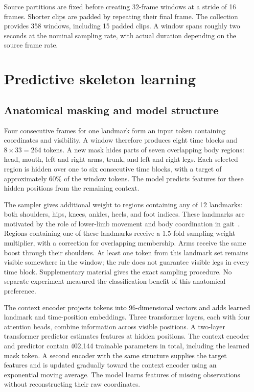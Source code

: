 \documentclass[10pt,twocolumn,letterpaper]{article}
\begin{document}
Source partitions are fixed before creating 32-frame windows at a stride of 16 frames. Shorter clips are padded by repeating their final frame. The collection provides 358 windows, including 15 padded clips. A window spans roughly two seconds at the nominal sampling rate, with actual duration depending on the source frame rate.

\section{Predictive skeleton learning}
\subsection{Anatomical masking and model structure}
Four consecutive frames for one landmark form an input token containing coordinates and visibility. A window therefore produces eight time blocks and $8\times33=264$ tokens. A new mask hides parts of seven overlapping body regions: head, mouth, left and right arms, trunk, and left and right legs. Each selected region is hidden over one to six consecutive time blocks, with a target of approximately 60\% of the window tokens. The model predicts features for these hidden positions from the remaining context.

The sampler gives additional weight to regions containing any of 12 landmarks: both shoulders, hips, knees, ankles, heels, and foot indices. These landmarks are motivated by the role of lower-limb movement and body coordination in gait~\cite{filli2018,plotnik2020}. Regions containing one of these landmarks receive a 1.5-fold sampling-weight multiplier, with a correction for overlapping membership. Arms receive the same boost through their shoulders. At least one token from this landmark set remains visible somewhere in the window; the rule does not guarantee visible legs in every time block. Supplementary material gives the exact sampling procedure. No separate experiment measured the classification benefit of this anatomical preference.

The context encoder projects tokens into 96-dimensional vectors and adds learned landmark and time-position embeddings. Three transformer layers, each with four attention heads, combine information across visible positions. A two-layer transformer predictor estimates features at hidden positions. The context encoder and predictor contain 402,144 trainable parameters in total, including the learned mask token. A second encoder with the same structure supplies the target features and is updated gradually toward the context encoder using an exponential moving average. The model learns features of missing observations without reconstructing their raw coordinates.
\end{document}
